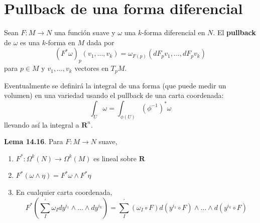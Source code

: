 \documentclass[11pt]{article}
\begin{document}
\section{Pullback de una forma diferencial}

Sean $F:M\longrightarrow N$ una función suave y  $\omega$ una $k$-forma diferencial en $N$. El \textbf{pullback} de $\omega$ es una $k$-forma en $M$ dada por  
\begin{equation*}
(F^*\omega)_p(v_1,...,v_k)=\omega_{F(p)}(dF_pv_1,...,dF_{p}v_k)
\end{equation*}
para $p\in M$ y $v_1,...,v_k$ vectores en $T_pM$.

Eventualmente se definirá la integral de una forma (que puede medir un volumen) en una variedad usando el pullback de una carta coordenada:
\begin{equation*}
    \int_U\omega=\int_{\phi(U)}(\phi^{-1})^*\omega
\end{equation*}
llevando así la integral a $\mathbf{R}^n$. \par
    \par\textbf{Lema 14.16}. Para $F:M\longrightarrow N$ suave,
    \begin{enumerate}[label=(\alph*)]
        \item $F^*:\Omega^k(N)\longrightarrow\Omega^k(M)$ es lineal sobre $\mathbf{R}$
        \item $F^*(\omega\wedge\eta)=F^*\omega\wedge F^*\eta$
        \item En cualquier carta coordenada,
        \begin{equation*}
            F^*\left(\sum_{I}^{'}\omega_Idy^{i_1}\wedge\ldots\wedge dy^{i_k}\right)=\sum_I^{'} (\omega_I\circ F) d(y^{i_1}\circ F)\wedge \ldots\wedge  d(y^{i_k}\circ F)
        \end{equation*}
    \end{enumerate}
\end{document}
